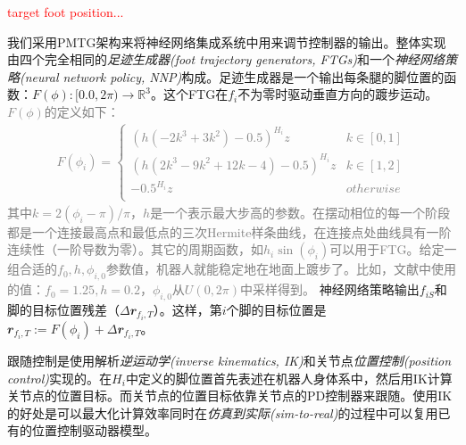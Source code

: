 \textcolor{red}{target foot position...}

我们采用PMTG架构来将神经网络集成系统中用来调节控制器的输出。整体实现由四个完全相同的\emph{足迹生成器(foot trajectory generators, FTGs)}和一个\emph{神经网络策略(neural network policy, NNP)}构成。足迹生成器是一个输出每条腿的脚位置的函数：$F(\phi):[0.0,2\pi)\to \mathbb{R}^3$。这个FTG在$f_i$不为零时驱动垂直方向的踱步运动。
\textcolor{gray}{\small
$F(\phi)$的定义如下：
\begin{align}
    F(\phi_i)=\begin{cases}
        (h(-2k^3+3k^2)-0.5)^{H_i}z &k\in[0,1]\\
        (h(2k^3-9k^2+12k-4)-0.5)^{H_i}z &k\in[1,2]\\
        -0.5^{H_i}z & otherwise\\
    \end{cases}
\end{align}
其中$k=2(\phi_i-\pi)/\pi$，$h$是一个表示最大步高的参数。在摆动相位的每一个阶段都是一个连接最高点和最低点的三次Hermite样条曲线，在连接点处曲线具有一阶连续性（一阶导数为零）。其它的周期函数，如$h_i \sin (\phi_i)$可以用于FTG。给定一组合适的$f_0,h,\phi_{i,0}$参数值，机器人就能稳定地在地面上踱步了。比如，文献\cite[p7]{Lee_Hwangbo_Wellhausen_Koltun_Hutter_2020}中使用的值：$f_0=1.25,h=0.2$，$\phi_{i,0}$从$U(0,2\pi)$中采样得到。}
神经网络策略输出$f_{iS}$和脚的目标位置残差（$\Delta \mathbfit{r}_{f_i, T}$）。这样，第$i$个脚的目标位置是$\mathbfit{r}_{f_i, T}:=F(\phi_i)+\Delta \mathbfit{r}_{f_i, T}$。

跟随控制是使用解析\emph{逆运动学(inverse kinematics, IK)}和关节点\emph{位置控制(position control)}实现的。在$H_i$中定义的脚位置首先表述在机器人身体系中，然后用IK计算关节点的位置目标。而关节点的位置目标依靠关节点的PD控制器来跟随。使用IK的好处是可以最大化计算效率同时在\emph{仿真到实际(sim-to-real)}的过程中可以复用已有的位置控制驱动器模型\cite[p]{Lee_Hwangbo_Hutter_2019,Hwangbo_Bellicoso_Fankhauser_Huttery_2016}。
